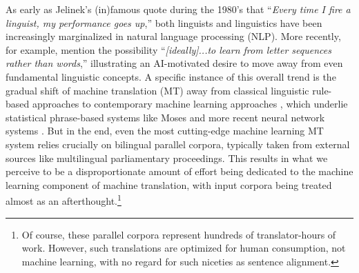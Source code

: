 As early as Jelinek's (in)famous quote during the 1980's that ``{\em Every time I fire a linguist, my performance goes up},'' both linguists and linguistics have been increasingly marginalized in natural language processing (NLP). 
More recently, for example,  mention the possibility ``{\em [ideally]...to learn from letter sequences rather than words},'' illustrating an AI-motivated desire to move away from even fundamental linguistic concepts.
A specific instance of this overall trend is the gradual shift of machine translation (MT) away from classical linguistic rule-based approaches to contemporary machine learning approaches , which underlie statistical phrase-based systems like Moses  and more recent neural network systems .  
But in the end, even the most cutting-edge machine learning MT system relies crucially on bilingual parallel corpora, typically taken from external sources like multilingual parliamentary proceedings. 
This results in what we perceive to be a disproportionate amount of effort being dedicated to the machine learning component of machine translation, with input corpora being treated almost as an afterthought.\footnote{
    Of course, these parallel corpora represent hundreds of translator-hours of work. 
    However, such translations are optimized for human consumption, not machine learning, with no regard for such niceties as sentence alignment.
} %
    
%



